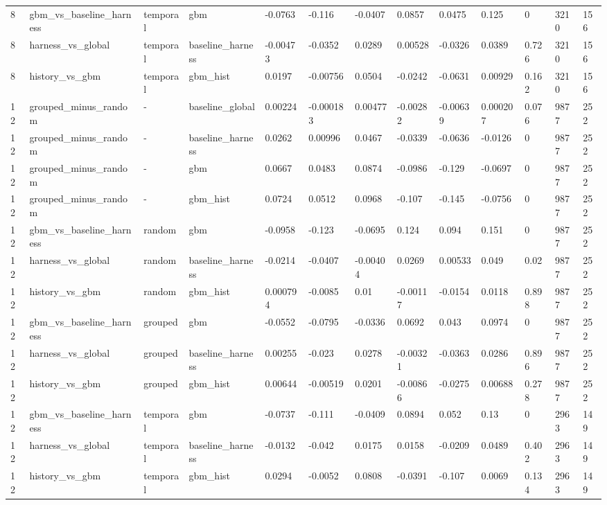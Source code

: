 \begin{tabular}{lllllllllllll}
8 & gbm\_vs\_baseline\_harness & temporal & gbm & -0.0763 & -0.116 & -0.0407 & 0.0857 & 0.0475 & 0.125 & 0 & 3210 & 156 \\
8 & harness\_vs\_global & temporal & baseline\_harness & -0.00473 & -0.0352 & 0.0289 & 0.00528 & -0.0326 & 0.0389 & 0.726 & 3210 & 156 \\
8 & history\_vs\_gbm & temporal & gbm\_hist & 0.0197 & -0.00756 & 0.0504 & -0.0242 & -0.0631 & 0.00929 & 0.162 & 3210 & 156 \\
12 & grouped\_minus\_random & - & baseline\_global & 0.00224 & -0.000183 & 0.00477 & -0.00282 & -0.00639 & 0.000207 & 0.076 & 9877 & 252 \\
12 & grouped\_minus\_random & - & baseline\_harness & 0.0262 & 0.00996 & 0.0467 & -0.0339 & -0.0636 & -0.0126 & 0 & 9877 & 252 \\
12 & grouped\_minus\_random & - & gbm & 0.0667 & 0.0483 & 0.0874 & -0.0986 & -0.129 & -0.0697 & 0 & 9877 & 252 \\
12 & grouped\_minus\_random & - & gbm\_hist & 0.0724 & 0.0512 & 0.0968 & -0.107 & -0.145 & -0.0756 & 0 & 9877 & 252 \\
12 & gbm\_vs\_baseline\_harness & random & gbm & -0.0958 & -0.123 & -0.0695 & 0.124 & 0.094 & 0.151 & 0 & 9877 & 252 \\
12 & harness\_vs\_global & random & baseline\_harness & -0.0214 & -0.0407 & -0.00404 & 0.0269 & 0.00533 & 0.049 & 0.02 & 9877 & 252 \\
12 & history\_vs\_gbm & random & gbm\_hist & 0.000794 & -0.0085 & 0.01 & -0.00117 & -0.0154 & 0.0118 & 0.898 & 9877 & 252 \\
12 & gbm\_vs\_baseline\_harness & grouped & gbm & -0.0552 & -0.0795 & -0.0336 & 0.0692 & 0.043 & 0.0974 & 0 & 9877 & 252 \\
12 & harness\_vs\_global & grouped & baseline\_harness & 0.00255 & -0.023 & 0.0278 & -0.00321 & -0.0363 & 0.0286 & 0.896 & 9877 & 252 \\
12 & history\_vs\_gbm & grouped & gbm\_hist & 0.00644 & -0.00519 & 0.0201 & -0.00866 & -0.0275 & 0.00688 & 0.278 & 9877 & 252 \\
12 & gbm\_vs\_baseline\_harness & temporal & gbm & -0.0737 & -0.111 & -0.0409 & 0.0894 & 0.052 & 0.13 & 0 & 2963 & 149 \\
12 & harness\_vs\_global & temporal & baseline\_harness & -0.0132 & -0.042 & 0.0175 & 0.0158 & -0.0209 & 0.0489 & 0.402 & 2963 & 149 \\
12 & history\_vs\_gbm & temporal & gbm\_hist & 0.0294 & -0.0052 & 0.0808 & -0.0391 & -0.107 & 0.0069 & 0.134 & 2963 & 149 \\

\end{tabular}
